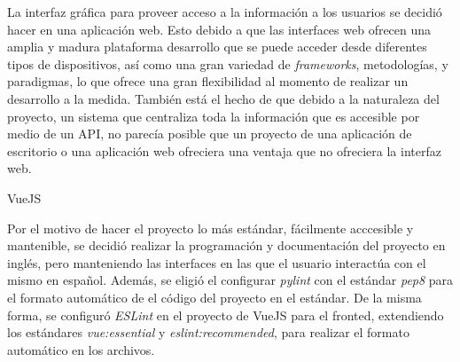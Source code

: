 La interfaz gráfica para proveer acceso a la información a los usuarios se decidió hacer en una aplicación web. Esto debido a que las interfaces web ofrecen una amplia y madura plataforma desarrollo que se puede acceder desde diferentes tipos de dispositivos, así como una gran variedad de \textit{frameworks}, metodologías, y paradigmas, lo que ofrece una gran flexibilidad al momento de realizar un desarrollo a la medida. También está el hecho de que debido a la naturaleza del proyecto, un sistema que centraliza toda la información que es accesible por medio de un API, no parecía posible que un proyecto de una aplicación de escritorio o una aplicación web ofreciera una ventaja que no ofreciera la interfaz web.

VueJS

Por el motivo de hacer el proyecto lo más estándar, fácilmente acccesible y mantenible, se decidió realizar la programación y documentación del proyecto en inglés, pero manteniendo las interfaces en las que el usuario interactúa con el mismo en español. Además, se eligió el configurar \textit{pylint} con el estándar \textit{pep8} para el formato automático de el código del proyecto en el estándar. De la misma forma, se configuró \textit{ESLint} en el proyecto de VueJS para el fronted, extendiendo los estándares \textit{vue:essential} y \textit{eslint:recommended}, para realizar el formato automático en los archivos.

